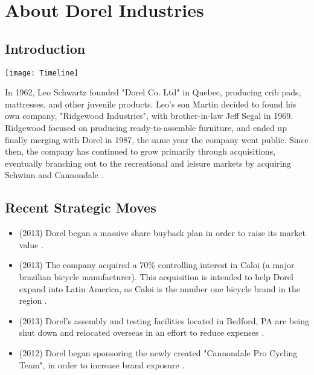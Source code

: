 \chapter{About Dorel Industries}
\label{chp:about}
\section{Introduction}
\centerline{\texttt{[image: Timeline]}}
In 1962, Leo Schwartz founded "Dorel Co. Ltd" in Quebec, producing crib pads, mattresses, and other juvenile products.  Leo's son Martin decided to found his own company, "Ridgewood Industries", with brother-in-law Jeff Segal in 1969.  Ridgewood focused on producing ready-to-assemble furniture, and ended up finally merging with Dorel in 1987, the same year the company went public.  Since then, the company has continued to grow primarily through acquisitions, eventually branching out to the recreational and leisure markets by acquiring Schwinn and Cannondale \cite{DorelIndustries2013}.


\section{Recent Strategic Moves}
\begin{itemize}
  \item (2013) Dorel began a massive share buyback plan in order to raise its market value \cite{Smith2014}.
  \item (2013) The company acquired a 70\% controlling interest in Caloi (a major brazilian bicycle manufacturer).  This acquisition is intended to help Dorel expand into Latin America, as Caloi is the number one bicycle brand in the region \cite{DorelIndustries2013}.
  \item (2013) Dorel’s assembly and testing facilities located in Bedford, PA are being shut down and relocated overseas in an effort to reduce expenses \cite{VoiceofAmerica2009}.
  \item (2012) Dorel began sponsoring the newly created "Cannondale Pro Cycling Team", in order to increase brand exposure \cite{DorelIndustries2012} .
\end{itemize}







